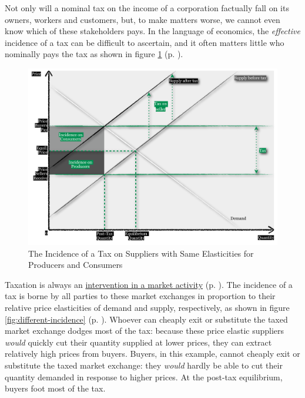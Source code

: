 Not only will a nominal tax on the income of a corporation factually fall on its owners, workers and customers, but, to make matters worse, we cannot even know which of these stakeholders pays. In the language of economics, the \emph{effective} incidence of a tax can be difficult to ascertain, and it often matters little who nominally pays the tax as shown in figure \ref{fig:same-incidence} (p. \pageref{fig:same-incidence}). 

 \begin{figure}[htbp]
	\centering
	\includegraphics[width=1\textwidth]{./img/same-incidence}  
	\caption[Incidence of a Tax on Suppliers with Unit-Elastic Supply and Demand]{The Incidence of a Tax on Suppliers with Same Elasticities for Producers and Consumers}
	\label{fig:same-incidence}
\end{figure}

Taxation is always an \hyperref[sec:marketvscommand]{intervention in a market activity} (p. \pageref{sec:marketvscommand}). The incidence of a tax is borne by all parties to these market exchanges in proportion to their relative price elasticities of demand and supply, respectively, as shown in figure \ref{fig:different-incidence} (p. \pageref{fig:different-incidence}). Whoever can cheaply exit or substitute the taxed market exchange dodges most of the tax: because these price elastic suppliers \emph{would} quickly cut their quantity supplied at lower prices, they can extract relatively high prices from buyers. Buyers, in this example, cannot cheaply exit or substitute the taxed market exchange: they \emph{would} hardly be able to cut their quantity demanded in response to higher prices. At the post-tax equilibrium, buyers foot most of the tax.

